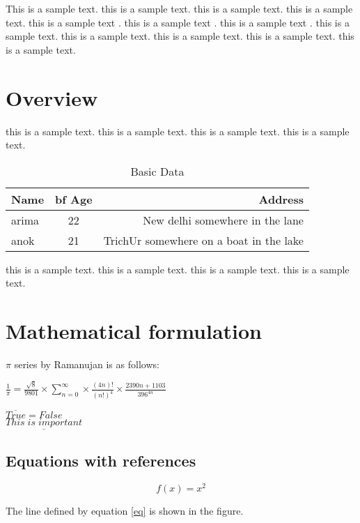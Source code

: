 \documentclass{report}
\begin{document}
\vspace{1mm}
\noindent
This is  a sample text.
this is  a sample text.
this is  a sample text.
this is  a sample text.
this is  a sample text \cite{Meyer2000}.
this is  a sample text \cite{Codishetal2000}.
this is  a sample text \cite{Huetal2000}.
this is  a sample text.
this is  a sample text.
this is  a sample text.
this is  a sample text.
this is  a sample text.


\chapter{Overview }

this is  a sample text.
this is  a sample text.
this is  a sample text.
this is  a sample text.

\begin{table}
\caption{Basic Data}
\begin{tabular} {|l|c|r|}
\hline
{\bf Name} & {bf Age} & {\bf Address} \\ \hline \hline
arima & 22 & New delhi somewhere in the lane\\
\hline
anok & 21 & TrichUr somewhere on a boat in the lake \\
\hline
\end{tabular}
\end{table}

this is  a sample text.
this is  a sample text.
this is  a sample text.
this is  a sample text.

\chapter{Mathematical formulation}

$\pi$ series by Ramanujan is as follows:

$\frac{1}{\pi} = \frac{\sqrt{8}}{9801} \times \sum\limits_{n=0}^{\infty} \times \frac{(4n)!}{(n!)^{4}} \times \frac{2390n+1103}{{396}^{4n}}$

$\overline{True} = False$ \\
$\underline{This \; is  \;important}$

\section{Equations with references}
\begin{equation} \label{eq}
 f(x) = x^{2} 
\end{equation}

The line defined by equation \ref{eq} is shown in the figure.
\end{document}
